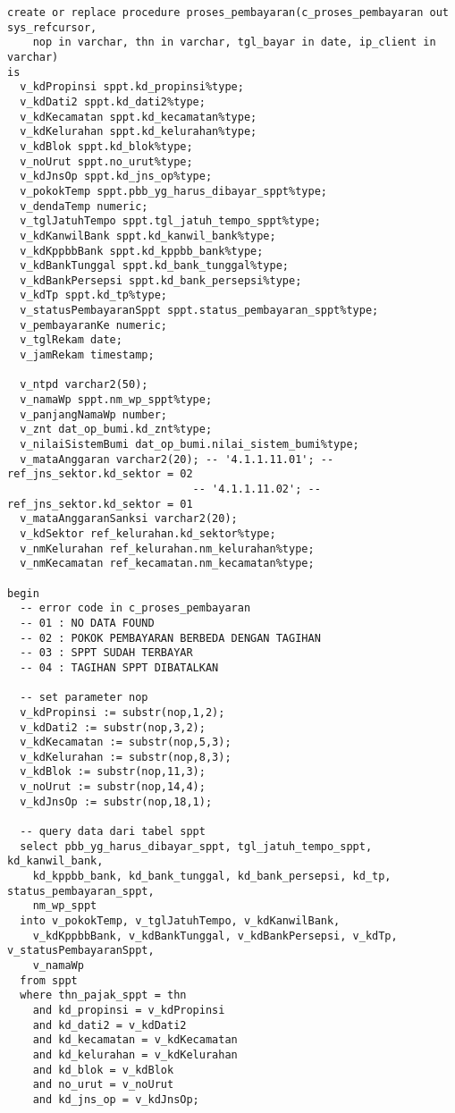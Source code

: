 \documentclass[pdftex,12pt, oneside]{article}
\begin{document}
  \begin{lstlisting}
create or replace procedure proses_pembayaran(c_proses_pembayaran out sys_refcursor,
    nop in varchar, thn in varchar, tgl_bayar in date, ip_client in varchar)
is
  v_kdPropinsi sppt.kd_propinsi%type;
  v_kdDati2 sppt.kd_dati2%type;
  v_kdKecamatan sppt.kd_kecamatan%type;
  v_kdKelurahan sppt.kd_kelurahan%type;
  v_kdBlok sppt.kd_blok%type;
  v_noUrut sppt.no_urut%type;
  v_kdJnsOp sppt.kd_jns_op%type;
  v_pokokTemp sppt.pbb_yg_harus_dibayar_sppt%type;
  v_dendaTemp numeric;
  v_tglJatuhTempo sppt.tgl_jatuh_tempo_sppt%type;
  v_kdKanwilBank sppt.kd_kanwil_bank%type;
  v_kdKppbbBank sppt.kd_kppbb_bank%type;
  v_kdBankTunggal sppt.kd_bank_tunggal%type;
  v_kdBankPersepsi sppt.kd_bank_persepsi%type;
  v_kdTp sppt.kd_tp%type;
  v_statusPembayaranSppt sppt.status_pembayaran_sppt%type;
  v_pembayaranKe numeric;
  v_tglRekam date;
  v_jamRekam timestamp;

  v_ntpd varchar2(50);
  v_namaWp sppt.nm_wp_sppt%type;
  v_panjangNamaWp number;
  v_znt dat_op_bumi.kd_znt%type;
  v_nilaiSistemBumi dat_op_bumi.nilai_sistem_bumi%type;
  v_mataAnggaran varchar2(20); -- '4.1.1.11.01'; -- ref_jns_sektor.kd_sektor = 02
                             -- '4.1.1.11.02'; -- ref_jns_sektor.kd_sektor = 01
  v_mataAnggaranSanksi varchar2(20);
  v_kdSektor ref_kelurahan.kd_sektor%type;
  v_nmKelurahan ref_kelurahan.nm_kelurahan%type;
  v_nmKecamatan ref_kecamatan.nm_kecamatan%type;

begin
  -- error code in c_proses_pembayaran
  -- 01 : NO DATA FOUND
  -- 02 : POKOK PEMBAYARAN BERBEDA DENGAN TAGIHAN
  -- 03 : SPPT SUDAH TERBAYAR
  -- 04 : TAGIHAN SPPT DIBATALKAN

  -- set parameter nop
  v_kdPropinsi := substr(nop,1,2);
  v_kdDati2 := substr(nop,3,2);
  v_kdKecamatan := substr(nop,5,3);
  v_kdKelurahan := substr(nop,8,3);
  v_kdBlok := substr(nop,11,3);
  v_noUrut := substr(nop,14,4);
  v_kdJnsOp := substr(nop,18,1);

  -- query data dari tabel sppt
  select pbb_yg_harus_dibayar_sppt, tgl_jatuh_tempo_sppt, kd_kanwil_bank,
    kd_kppbb_bank, kd_bank_tunggal, kd_bank_persepsi, kd_tp, status_pembayaran_sppt,
    nm_wp_sppt
  into v_pokokTemp, v_tglJatuhTempo, v_kdKanwilBank,
    v_kdKppbbBank, v_kdBankTunggal, v_kdBankPersepsi, v_kdTp, v_statusPembayaranSppt,
    v_namaWp
  from sppt
  where thn_pajak_sppt = thn
    and kd_propinsi = v_kdPropinsi
    and kd_dati2 = v_kdDati2
    and kd_kecamatan = v_kdKecamatan
    and kd_kelurahan = v_kdKelurahan
    and kd_blok = v_kdBlok
    and no_urut = v_noUrut
    and kd_jns_op = v_kdJnsOp;


\end{lstlisting}
\end{document}

